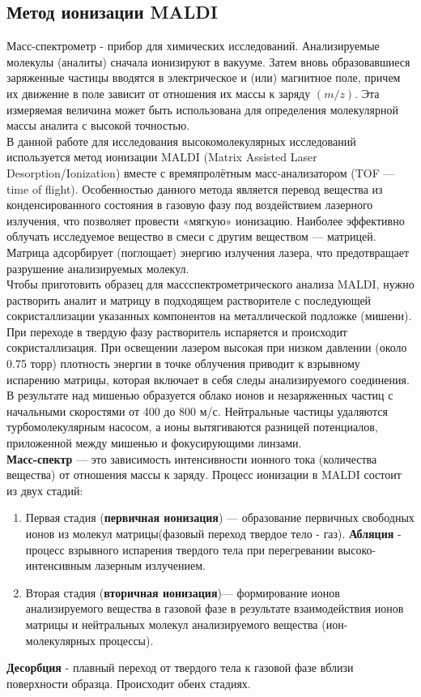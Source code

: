 \documentclass[12pt]{article}
\begin{document}
\begin{flushleft}
\subsection{Метод ионизации MALDI}
Масс-спектрометр - прибор для химических исследований. Анализируемые молекулы (аналиты) сначала ионизируют в вакууме. Затем вновь
образовавшиеся заряженные частицы вводятся в электрическое и (или) магнитное поле,
причем их движение в поле зависит от отношения их массы к заряду $(m/z)$. Эта измеряемая величина может быть использована для определения молекулярной массы
аналита с высокой точностью.\\
\vspace{1em}
В данной работе для исследования высокомолекулярных исследований используется метод ионизации MALDI (Matrix Assisted
Laser Desorption/Ionization) вместе с времяпролётным масс-анализатором (TOF — time
of flight). Особенностью данного метода является перевод вещества из конденсированного состояния в газовую фазу под воздействием лазерного излучения, что позволяет провести «мягкую» ионизацию. Наиболее эффективно облучать исследуемое вещество
в смеси с другим веществом —  матрицей. Матрица адсорбирует (поглощает) энергию излучения лазера, что предотвращает разрушение анализируемых молекул. \\
\vspace{1em}
Чтобы приготовить образец для массспектрометрического анализа MALDI, нужно растворить аналит и матрицу в
подходящем растворителе с последующей сокристаллизации указанных компонентов на
металлической подложке (мишени). При переходе в твердую фазу растворитель испаряется и происходит сокристаллизация. При освещении лазером высокая при низком давлении (около 0.75 торр)
плотность энергии в точке облучения приводит к взрывному испарению матрицы, которая
включает в себя следы анализируемого соединения. В результате над мишенью образуется облако ионов и незаряженных частиц с начальными скоростями от 400 до 800 м/с. Нейтральные частицы удаляются турбомолекулярным насосом, а ионы вытягиваются разницей потенциалов, приложенной между мишенью и фокусирующими линзами.\\
\textbf{Масс-спектр} — это зависимость интенсивности ионного тока (количества вещества) от
отношения массы к заряду.
\newpage
Процесс ионизации в MALDI состоит из двух стадий:
\begin{enumerate}
\item Первая стадия (\textbf{первичная ионизация}) — образование первичных свободных ионов из молекул матрицы(фазовый переход твердое тело - газ). \textbf{Абляция} - процесс взрывного испарения твердого тела при перегревании высоко-интенсивным лазерным излучением.
\item Вторая стадия (\textbf{вторичная ионизация})— формирование ионов анализируемого вещества в газовой фазе в
результате взаимодействия ионов матрицы и нейтральных молекул анализируемого
вещества (ион-молекулярных процессы).
\end{enumerate}
\textbf{Десорбция} - плавный переход от твердого тела к газовой фазе вблизи поверхности образца. Происходит обеих стадиях.

\end{flushleft}
\end{document}
